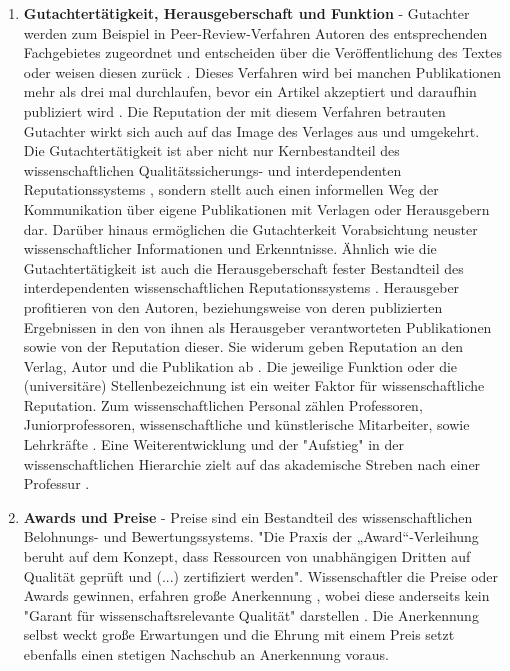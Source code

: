 \begin{enumerate}
\item \textbf{Gutachtertätigkeit, Herausgeberschaft und Funktion} - Gutachter werden zum Beispiel in Peer-Review-Verfahren Autoren des entsprechenden Fachgebietes zugeordnet und entscheiden über die Veröffentlichung des Textes oder weisen diesen zurück \cite{Frey_2005}. Dieses Verfahren wird bei manchen Publikationen mehr als drei mal durchlaufen, bevor ein Artikel akzeptiert und daraufhin publiziert wird \cite{Frey_2005}. Die Reputation der mit diesem Verfahren betrauten Gutachter wirkt sich auch auf das Image des Verlages aus und umgekehrt. Die Gutachtertätigkeit ist aber nicht nur Kernbestandteil des wissenschaftlichen Qualitätssicherungs- und interdependenten Reputationssystems \cite{Frey_2005} \cite{mueller_2009_peerreview}, sondern stellt auch einen informellen Weg der Kommunikation über eigene Publikationen mit Verlagen oder Herausgebern dar. Darüber hinaus ermöglichen die Gutachterkeit Vorabsichtung neuster wissenschaftlicher Informationen und Erkenntnisse. Ähnlich wie die Gutachtertätigkeit ist auch die Herausgeberschaft fester Bestandteil des interdependenten wissenschaftlichen Reputationssystems \cite{Frey_2005}. Herausgeber profitieren von den Autoren, beziehungsweise von deren publizierten Ergebnissen in den von ihnen als Herausgeber verantworteten Publikationen sowie von der Reputation dieser. Sie widerum geben Reputation an den Verlag, Autor und die Publikation ab \cite{suchen}. Die jeweilige Funktion oder die (universitäre) Stellenbezeichnung ist ein weiter Faktor für wissenschaftliche Reputation. Zum wissenschaftlichen Personal zählen Professoren, Juniorprofessoren, wissenschaftliche und künstlerische Mitarbeiter, sowie Lehrkräfte \cite{erhardt_2011_hochschulen}. Eine Weiterentwicklung und der "Aufstieg" in der wissenschaftlichen Hierarchie zielt auf das akademische Streben nach einer Professur \cite{Klecha_2008}.
\item \textbf{Awards und Preise} - Preise sind ein Bestandteil des wissenschaftlichen Belohnungs- und Bewertungssystems. "Die Praxis der „Award“-Verleihung beruht auf dem Konzept, dass Ressourcen von unabhängigen Dritten auf Qualität geprüft und (...) zertifiziert werden". Wissenschaftler die Preise oder Awards gewinnen, erfahren große Anerkennung \cite{suchen}, wobei diese anderseits kein "Garant für wissenschaftsrelevante Qualität" darstellen \cite{bargheer_2002_qualitatskriterien}. Die Anerkennung selbst weckt große Erwartungen und die Ehrung mit einem Preis setzt ebenfalls einen stetigen Nachschub an Anerkennung voraus\cite{suchen}.
\end{enumerate}


